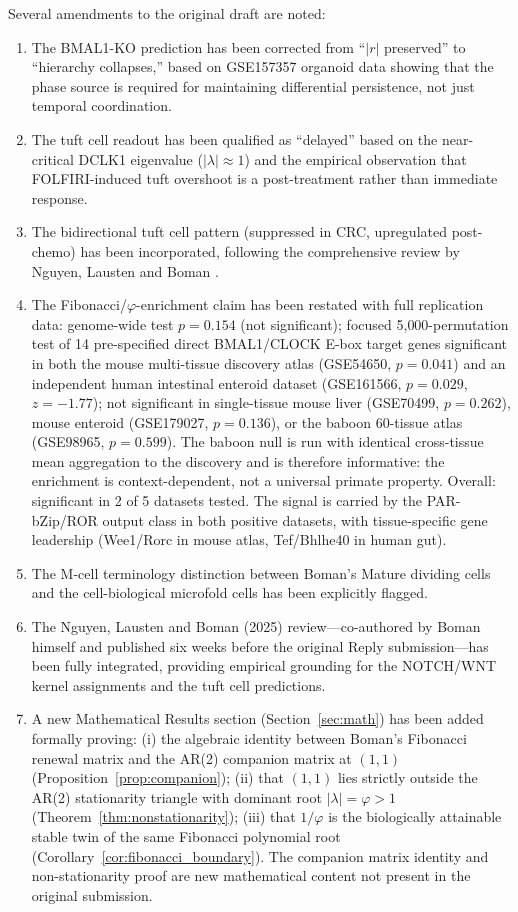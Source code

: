 \documentclass[11pt,letterpaper]{article}
\theoremstyle{definition}
\theoremstyle{remark}
\begin{document}
Several amendments to the original draft are noted:
\begin{enumerate}
\item The BMAL1-KO prediction has been corrected from ``$|r|$ preserved'' to ``hierarchy collapses,'' based on GSE157357 organoid data showing that the phase source is required for maintaining differential persistence, not just temporal coordination.
\item The tuft cell readout has been qualified as ``delayed'' based on the near-critical DCLK1 eigenvalue ($|\lambda| \approx 1$) and the empirical observation that FOLFIRI-induced tuft overshoot is a post-treatment rather than immediate response.
\item The bidirectional tuft cell pattern (suppressed in CRC, upregulated post-chemo) has been incorporated, following the comprehensive review by Nguyen, Lausten and Boman \citep{nguyen2025colonic}.
\item The Fibonacci/$\varphi$-enrichment claim has been restated with full replication data: genome-wide test $p = 0.154$ (not significant); focused 5{,}000-permutation test of 14 pre-specified direct BMAL1/CLOCK E-box target genes significant in both the mouse multi-tissue discovery atlas (GSE54650, $p = 0.041$) and an independent human intestinal enteroid dataset (GSE161566, $p = 0.029$, $z = -1.77$); not significant in single-tissue mouse liver (GSE70499, $p = 0.262$), mouse enteroid (GSE179027, $p = 0.136$), or the baboon 60-tissue atlas (GSE98965, $p = 0.599$). The baboon null is run with identical cross-tissue mean aggregation to the discovery and is therefore informative: the enrichment is context-dependent, not a universal primate property. Overall: significant in 2 of 5 datasets tested. The signal is carried by the PAR-bZip/ROR output class in both positive datasets, with tissue-specific gene leadership (Wee1/Rorc in mouse atlas, Tef/Bhlhe40 in human gut).
\item The M-cell terminology distinction between Boman's Mature dividing cells and the cell-biological microfold cells has been explicitly flagged.
\item The Nguyen, Lausten and Boman (2025) \citep{nguyen2025colonic} review---co-authored by Boman himself and published six weeks before the original Reply submission---has been fully integrated, providing empirical grounding for the NOTCH/WNT kernel assignments and the tuft cell predictions.
\item A new Mathematical Results section (Section~\ref{sec:math}) has been added formally proving: (i) the algebraic identity between Boman's Fibonacci renewal matrix and the AR(2) companion matrix at $(1,1)$ (Proposition~\ref{prop:companion}); (ii) that $(1,1)$ lies strictly outside the AR(2) stationarity triangle with dominant root $|\lambda|=\varphi>1$ (Theorem~\ref{thm:nonstationarity}); (iii) that $1/\varphi$ is the biologically attainable stable twin of the same Fibonacci polynomial root (Corollary~\ref{cor:fibonacci_boundary}). The companion matrix identity and non-stationarity proof are new mathematical content not present in the original submission.
\end{enumerate}
\end{document}
